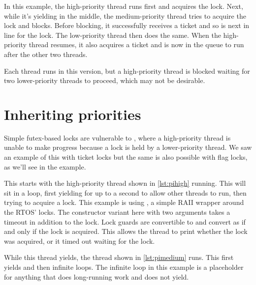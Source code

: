 In this example, the high-priority thread runs first and acquires the lock.
Next, while it's yielding in the middle, the medium-priority thread tries to acquire the lock and blocks.
Before blocking, it successfully receives a ticket and so is next in line for the lock.
The low-priority thread then does the same.
When the high-priority thread resumes, it also acquires a ticket and is now in the queue to run after the other two threads.

Each thread runs in this version, but a high-priority thread is blocked waiting for two lower-priority threads to proceed, which may not be desirable.

\section[label=priority_inheritance]{Inheriting priorities}

Simple futex-based locks are vulnerable to , where a high-priority thread is unable to make progress because a lock is held by a lower-priority thread.
We saw an example of this with ticket locks but the same is also possible with flag locks, as we'll see in the  example.

This starts with the high-priority thread shown in \ref{lst:pihigh} running.
This will sit in a loop, first yielding for up to a second to allow other threads to run, then trying to acquire a lock.
This example is using , a simple RAII wrapper around the RTOS' locks.
The constructor variant here with two arguments takes a timeout in addition to the lock.
Lock guards are convertible to  and convert as  if and only if the lock is acquired.
This allows the thread to print whether the lock was acquired, or it timed out waiting for the lock.

\codelisting[filename=examples/priority_inheritance/priority_inheritance.cc,marker=high,label=lst:pihigh,caption="A high-priority thread that will be starved"]{}

While this thread yields, the thread shown in \ref{lst:pimedium} runs.
This first yields and then infinite loops.
The infinite loop in this example is a placeholder for anything that does long-running work and does not yield.

\codelisting[filename=examples/priority_inheritance/priority_inheritance.cc,marker=medium,label=lst:pimedium,caption="A medium-priority thread that will starve a high-priority thread"]{}

